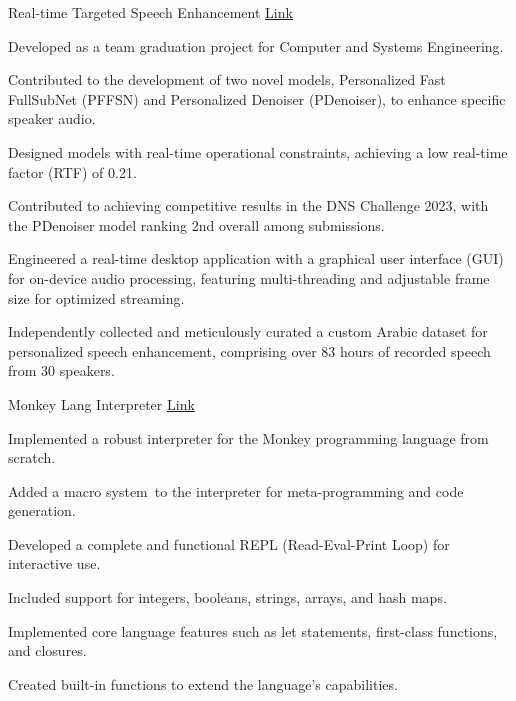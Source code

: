 

\begin{cventries}

  \cventry
    {Real-time Targeted Speech Enhancement} %
    {} %
    {}
    {\textcolor{link}{\href{https://github.com/ad3ldev/Realtime-Targeted-Speech-Enhancement}{Link}}} %
    {
      \begin{cvitems} %
        \item {Developed as a team graduation project for Computer and Systems Engineering.}
        \item {Contributed to the development of two novel models, Personalized Fast FullSubNet (PFFSN) and Personalized Denoiser (PDenoiser), to enhance specific speaker audio.}
        \item {Designed models with real-time operational constraints, achieving a low real-time factor (RTF) of 0.21.}
        \item {Contributed to achieving competitive results in the DNS Challenge 2023, with the PDenoiser model ranking 2nd overall among submissions.}
        \item {Engineered a real-time desktop application with a graphical user interface (GUI) for on-device audio processing, featuring multi-threading and adjustable frame size for optimized streaming.}
        \item {Independently collected and meticulously curated a custom Arabic dataset for personalized speech enhancement, comprising over 83 hours of recorded speech from 30 speakers.}
      \end{cvitems}
    }
  \cventry
    {Monkey Lang Interpreter} %
    {} %
    {}
    {\textcolor{link}{\href{https://github.com/ad3ldev/monkey-lang}{Link}}} %
    {
      \begin{cvitems} %
        \item {Implemented a robust interpreter for the Monkey programming language from scratch.}
        \item {Added a macro system to the interpreter for meta-programming and code generation.}
        \item {Developed a complete and functional REPL (Read-Eval-Print Loop) for interactive use.}
        \item {Included support for integers, booleans, strings, arrays, and hash maps.}
        \item {Implemented core language features such as let statements, first-class functions, and closures.}
        \item {Created built-in functions to extend the language's capabilities.}
      \end{cvitems}
    }
    
\end{cventries}

